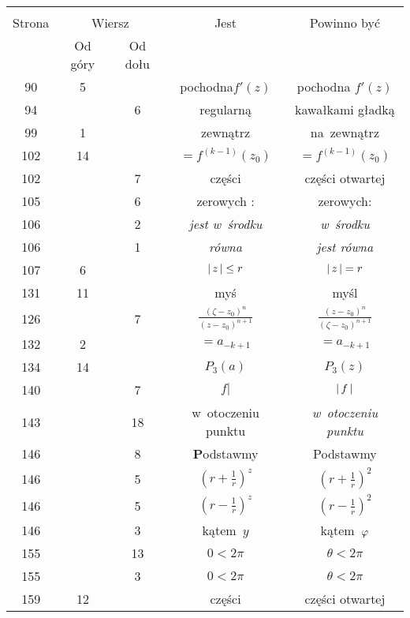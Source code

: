 \documentclass[a4paper,11pt]{article}
\begin{document}
\begin{center}
  \begin{tabular}{|c|c|c|c|c|}
    \hline
    & \multicolumn{2}{c|}{} & & \\
    Strona & \multicolumn{2}{c|}{Wiersz} & Jest
                              & Powinno być \\ \cline{2-3}
    & Od góry & Od dołu & & \\
    \hline
    90  &  5 & & pochodna$f'( z )$ & pochodna $f'( z )$ \\
    94  & &  6 & regularną & kawałkami gładką \\
    99  &  1 & & zewnątrz & na~zewnątrz \\
    102 & 14 & & $=\!\! f^{ ( k - 1 ) }( z_{ 0 } )$
           & $= f^{ ( k - 1 ) }( z_{ 0 } )$ \\
    102 & &  7 & części & części otwartej \\
    105 & &  6 & zerowych : & zerowych: \\
    106 & &  2 & \emph{jest w~środku} & \emph{w~środku} \\
    106 & &  1 & \emph{równa} & \emph{jest równa} \\
    107 &  6 & & $\left| \,  z  \, \right| \leq r$ & $\left| \,  z  \, \right| = r$ \\
    131 & 11 & & myś & myśl \\
    126 & &  7 & $\frac{ ( \zeta - z_{ 0 } )^{ n } }{
                 ( z - z_{ 0 } )^{ n + 1 } }$
           & $\frac{ ( z - z_{ 0 } )^{ n } }{
             ( \zeta - z_{ 0 } )^{ n + 1 } }$ \\
    132 &  2 & & $=\!\! a_{ -k + 1 }$ & $= a_{ -k + 1 }$ \\
    134 & 14 & & $P_{ 3 }( a )$ & $P_{ 3 }( z )$ \\
    140 & &  7 & $f |$ & $\left| \,  f  \, \right|$ \\
    143 & & 18 & w~otoczeniu punktu & \emph{w~otoczeniu punktu} \\
    146 & &  8 & \textbf{P}odstawmy & Podstawmy \\
    146 & &  5 & $( r + \frac{ 1 }{ r } )^{ z }$
           & $( r + \frac{ 1 }{ r } )^{ 2 }$ \\
    146 & &  5 & $( r - \frac{ 1 }{ r } )^{ z }$
           & $( r - \frac{ 1 }{ r } )^{ 2 }$ \\
    146 & &  3 & kątem~$y$ & kątem~$\varphi$ \\
    155 & & 13 & $0 < 2\pi$ & $\theta < 2\pi$ \\
    155 & &  3 & $0 < 2\pi$ & $\theta < 2\pi$ \\
    159 & 12 & & części & części otwartej \\

\end{tabular}
\end{center}
\end{document}
